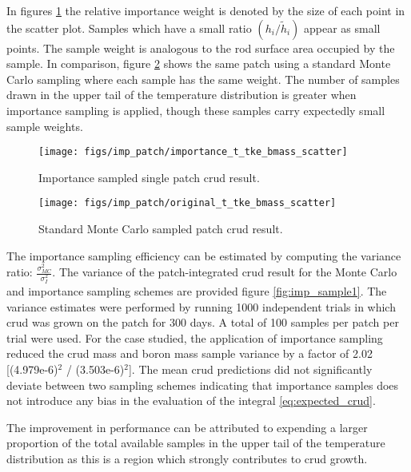 In figures \ref{fig:importancettkebmassscatter} the relative importance weight is denoted by the size of each point in the scatter plot.  Samples which have a small ratio $(h_i/\tilde h_i)$ appear as small points.  The sample weight is analogous to the rod surface area occupied by the sample.  In comparison, figure \ref{fig:originalttkebmassscatter} shows the same patch using a standard Monte Carlo sampling where each sample has the same weight.  The number of samples drawn in the upper tail of the temperature distribution is greater when importance sampling is applied, though these samples carry expectedly small sample weights.

\begin{figure}[H]
    \centering
    \texttt{[image: figs/imp\_patch/importance\_t\_tke\_bmass\_scatter]}
    \caption[Importance sampled single patch crud result.]{Importance sampled single patch crud result.}
    \label{fig:importancettkebmassscatter}
\end{figure}

\begin{figure}[H]
    \centering
    \texttt{[image: figs/imp\_patch/original\_t\_tke\_bmass\_scatter]}
    \caption[Standard Monte Carlo sampled patch crud result.]{Standard Monte Carlo sampled patch crud result.}
    \label{fig:originalttkebmassscatter}
\end{figure}

The importance sampling efficiency can be estimated by computing the variance ratio:  $\frac{\sigma^2_{MC}}{\sigma^2_{I}}$.  The variance of the patch-integrated crud result for the Monte Carlo and importance sampling schemes are provided figure \ref{fig:imp_sample1}.  The variance estimates were performed by running 1000 independent trials in which crud was grown on the patch for 300 days.  A total of 100 samples per patch per trial were used.  For the case studied, the application of importance sampling reduced the crud mass and boron mass sample variance by a factor of 2.02 [(4.979e-6)$^2$ / (3.503e-6)$^2$].  The mean crud predictions did not significantly deviate between two sampling schemes indicating that importance samples does not introduce any bias in the evaluation of the integral \ref{eq:expected_crud}.

The improvement in performance can be attributed to expending a larger proportion of the total available samples in the upper tail of the temperature distribution as this is a region which strongly contributes to crud growth.


